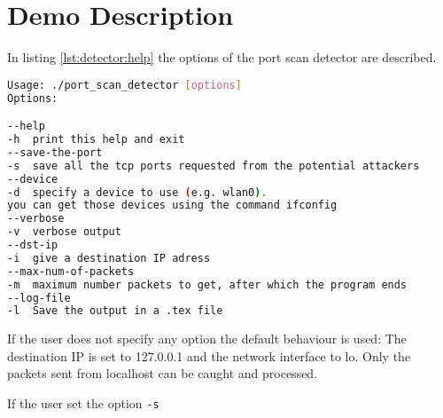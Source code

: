 \section{Demo Description}
In listing \ref{lst:detector:help} the options of the port scan detector are described.


\begin{lstlisting}[frame=single, language=BASH, label=lst:detector:help, caption=Help page of the port scan detector.]
Usage: ./port_scan_detector [options]
Options:

--help
-h	print this help and exit
--save-the-port
-s	save all the tcp ports requested from the potential attackers
--device
-d	specify a device to use (e.g. wlan0). 
you can get those devices using the command ifconfig
--verbose
-v	verbose output
--dst-ip
-i	give a destination IP adress
--max-num-of-packets
-m	maximum number packets to get, after which the program ends
--log-file
-l	Save the output in a .tex file
\end{lstlisting}
If the user does not specify any option the default behaviour is used:
The destination IP is set to 127.0.0.1 and the network interface to lo. Only
the packets sent from localhost can be caught and processed.

If the user set the option \lstinline{-s} 










